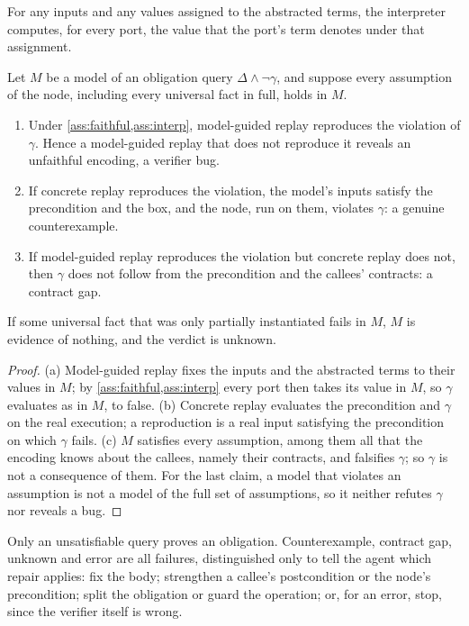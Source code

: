 \begin{assumption}\label{ass:interp}
For any inputs and any values assigned to the abstracted terms, the interpreter computes, for
every port, the value that the port's term denotes under that assignment.
\end{assumption}

\begin{theorem}\label{thm:replay}
Let $M$ be a model of an obligation query $\Delta\wedge\neg\gamma$, and suppose every
assumption of the node, including every universal fact in full, holds in $M$.
\begin{enumerate}[label=(\alph*)]
\item Under \cref{ass:faithful,ass:interp}, model-guided replay reproduces the violation of
  $\gamma$. Hence a model-guided replay that does not reproduce it reveals an unfaithful encoding,
  a verifier bug.
\item If concrete replay reproduces the violation, the model's inputs satisfy the precondition
  and the box, and the node, run on them, violates $\gamma$: a genuine counterexample.
\item If model-guided replay reproduces the violation but concrete replay does not, then
  $\gamma$ does not follow from the precondition and the callees' contracts: a contract gap.
\end{enumerate}
If some universal fact that was only partially instantiated fails in $M$, $M$ is evidence of
nothing, and the verdict is unknown.
\end{theorem}
\begin{proof}
(a) Model-guided replay fixes the inputs and the abstracted terms to their values in $M$; by
\cref{ass:faithful,ass:interp} every port then takes its value in $M$, so $\gamma$ evaluates as
in $M$, to false. (b) Concrete replay evaluates the precondition and $\gamma$ on the real
execution; a reproduction is a real input satisfying the precondition on which $\gamma$ fails.
(c) $M$ satisfies every assumption, among them all that the encoding knows about the callees,
namely their contracts, and falsifies $\gamma$; so $\gamma$ is not a consequence of them. For
the last claim, a model that violates an assumption is not a model of the full set of
assumptions, so it neither refutes $\gamma$ nor reveals a bug.
\end{proof}

Only an unsatisfiable query proves an obligation. Counterexample, contract gap, unknown and
error are all failures, distinguished only to tell the agent which repair applies: fix the
body; strengthen a callee's postcondition or the node's precondition; split the obligation or
guard the operation; or, for an error, stop, since the verifier itself is wrong.

